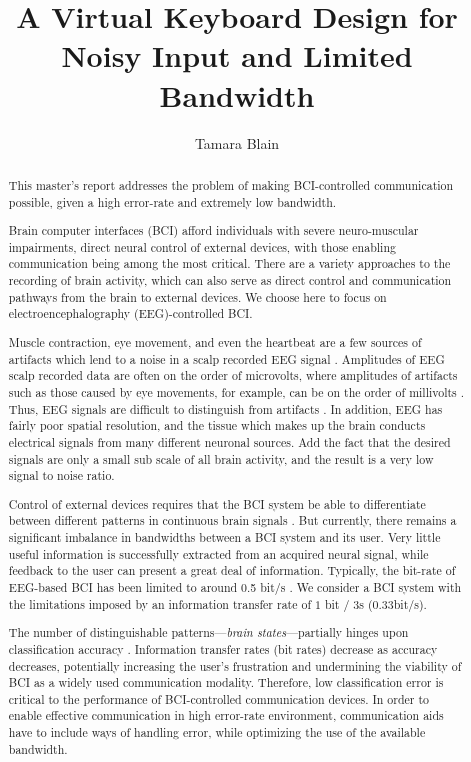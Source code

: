 \documentclass[12pt,titlepage]{article}
\begin{document}
\title{A Virtual Keyboard Design for Noisy Input and Limited Bandwidth} %
\author{Tamara Blain}
\maketitle

\begin{abstract}
This master's report addresses the problem of making BCI-controlled communication possible, given a high error-rate and extremely low bandwidth.

Brain computer interfaces (BCI) afford individuals with severe neuro-muscular impairments, direct neural control of external devices, with those enabling communication being among the most critical.  There are a variety approaches to the recording of brain activity, which can also serve as direct control and communication pathways from the brain to external devices.  We choose here to focus on electroencephalography (EEG)-controlled BCI.

Muscle contraction, eye movement, and even the heartbeat are a few sources of artifacts which lend to a noise in a scalp recorded EEG signal \cite{nunez_electric_2005}.  Amplitudes of EEG scalp recorded data are often on the order of microvolts, where amplitudes of artifacts such as those caused by eye movements, for example, can be on the order of millivolts \cite{tatum2007handbook}.  Thus, EEG signals are difficult to distinguish from artifacts \cite{nunez_electric_2005}.  In addition, EEG has fairly poor spatial resolution, and the tissue which makes up the brain conducts electrical signals from many 
different neuronal sources.  Add the fact that the desired signals are only a small sub scale of all 
brain activity, and the result is a very low signal to noise ratio.

Control of external devices requires that the BCI system be able to differentiate between different patterns in continuous brain signals \cite{lotte_review_2007}.  But currently, there remains a significant imbalance in bandwidths between a BCI system and its user.  Very little useful information is successfully extracted from an acquired neural signal, while feedback to the user can present a 
great deal of information.  Typically, the bit-rate of EEG-based BCI has been limited to around 0.5 bit/s \cite{millan2004}.  We consider a BCI system with the limitations imposed by an information transfer rate of $1$ bit $/$ $3$s (0.33bit/s).

The number of distinguishable patterns---\emph{brain states}---partially hinges upon classification 
accuracy \cite{lotte_review_2007}.  Information transfer rates (bit rates) decrease as accuracy decreases, potentially increasing the user's frustration and  undermining the viability of BCI as a widely used communication modality.  Therefore, low classification error is critical to the performance of BCI-controlled communication devices.  In order to enable effective communication in high error-rate environment, communication aids have to include ways of handling error, while optimizing the use of the available bandwidth.


\end{abstract}
\end{document}
